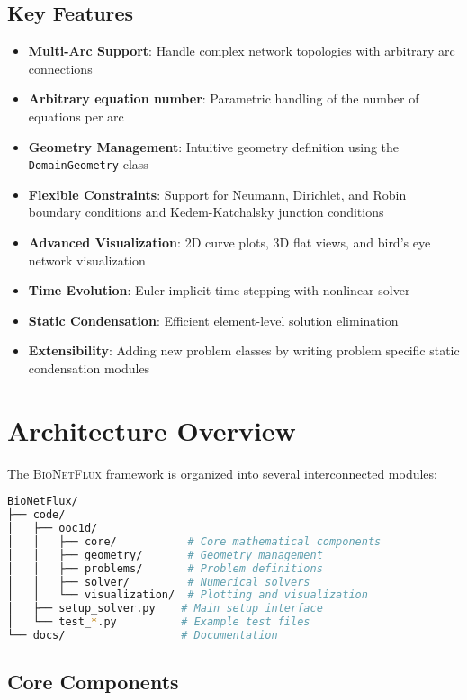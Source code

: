 \documentclass[11pt,a4paper]{article}
\newcommand{\code}[1]{\texttt{#1}}
\newcommand{\bionetflux}{\textsc{BioNetFlux}}
\begin{document}
\subsection{Key Features}

\begin{itemize}
    \item \textbf{Multi-Arc Support}: Handle complex network topologies with arbitrary arc connections
    \item \textbf{Arbitrary equation number}: Parametric handling of the number of equations per arc
    \item \textbf{Geometry Management}: Intuitive geometry definition using the \code{DomainGeometry} class
    \item \textbf{Flexible Constraints}: Support for Neumann, Dirichlet, and Robin boundary conditions and  Kedem-Katchalsky junction conditions
    \item \textbf{Advanced Visualization}: 2D curve plots, 3D flat views, and bird's eye network visualization
    \item \textbf{Time Evolution}: Euler implicit time stepping with nonlinear solver
    \item \textbf{Static Condensation}: Efficient element-level solution elimination
   \item \textbf{Extensibility}: Adding new problem classes by writing problem specific static condensation modules 
\end{itemize}

\section{Architecture Overview}

The \bionetflux{} framework is organized into several interconnected modules:

\begin{lstlisting}[language=bash, caption={BioNetFlux Directory Structure}]
BioNetFlux/
├── code/
│   ├── ooc1d/
│   │   ├── core/           # Core mathematical components
│   │   ├── geometry/       # Geometry management
│   │   ├── problems/       # Problem definitions
│   │   ├── solver/         # Numerical solvers
│   │   └── visualization/  # Plotting and visualization
│   ├── setup_solver.py    # Main setup interface
│   └── test_*.py          # Example test files
└── docs/                  # Documentation
\end{lstlisting}

\subsection{Core Components}
\end{document}
